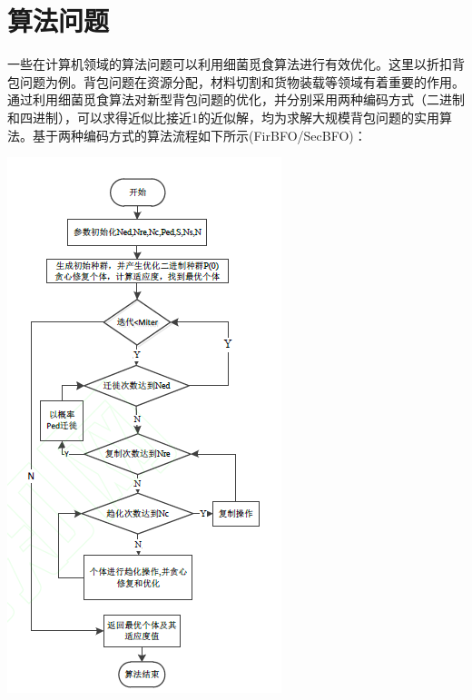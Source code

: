\documentclass{article}
\begin{document}
\section{算法问题}
一些在计算机领域的算法问题可以利用细菌觅食算法进行有效优化。这里以折扣背包问题为例。背包问题在资源分配，材料切割和货物装载等领域有着重要的作用。通过利用细菌觅食算法对新型背包问题的优化，并分别采用两种编码方式（二进制和四进制），可以求得近似比接近1的近似解，均为求解大规模背包问题的实用算法\cite{ref5}。基于两种编码方式的算法流程如下所示(FirBFO/SecBFO)：
\begin{center}
\includegraphics[scale=1]{fflow.png}

\end{center}
\end{document}
